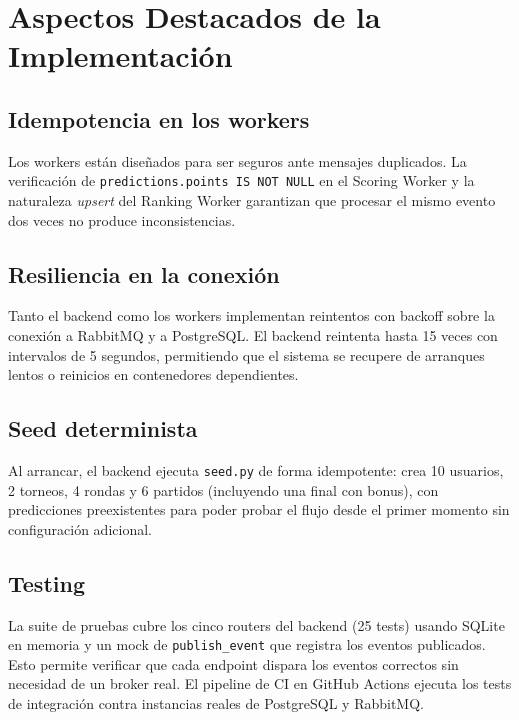 \documentclass[12pt, a4paper]{article}
\begin{document}
\section{Aspectos Destacados de la Implementación}

\subsection{Idempotencia en los workers}

Los workers están diseñados para ser seguros ante mensajes duplicados. La verificación de \texttt{predictions.points IS NOT NULL} en el Scoring Worker y la naturaleza \textit{upsert} del Ranking Worker garantizan que procesar el mismo evento dos veces no produce inconsistencias.

\subsection{Resiliencia en la conexión}

Tanto el backend como los workers implementan reintentos con backoff sobre la conexión a RabbitMQ y a PostgreSQL. El backend reintenta hasta 15 veces con intervalos de 5 segundos, permitiendo que el sistema se recupere de arranques lentos o reinicios en contenedores dependientes.

\subsection{Seed determinista}

Al arrancar, el backend ejecuta \texttt{seed.py} de forma idempotente: crea 10 usuarios, 2 torneos, 4 rondas y 6 partidos (incluyendo una final con bonus), con predicciones preexistentes para poder probar el flujo desde el primer momento sin configuración adicional.

\subsection{Testing}

La suite de pruebas cubre los cinco routers del backend (25 tests) usando SQLite en memoria y un mock de \texttt{publish\_event} que registra los eventos publicados. Esto permite verificar que cada endpoint dispara los eventos correctos sin necesidad de un broker real. El pipeline de CI en GitHub Actions ejecuta los tests de integración contra instancias reales de PostgreSQL y RabbitMQ.
\end{document}
